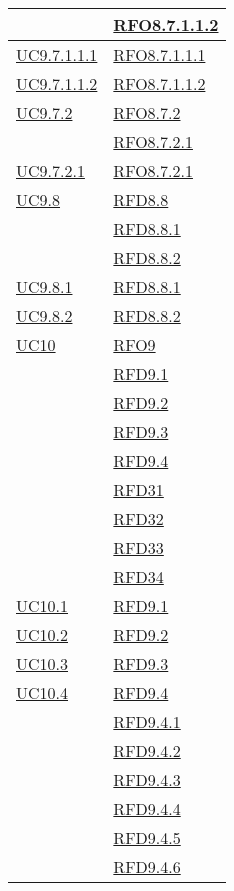 \begin{longtable}{|>{\centering}m{5cm}|m{5cm}<{\centering}|}
& \hyperlink{RFO8.7.1.1.2}{RFO8.7.1.1.2}\\ \hline
\hyperref[UC9.7.1.1.1]{UC9.7.1.1.1} & \hyperlink{RFO8.7.1.1.1}{RFO8.7.1.1.1}\\ \hline
\hyperref[UC9.7.1.1.2]{UC9.7.1.1.2} & \hyperlink{RFO8.7.1.1.2}{RFO8.7.1.1.2}\\ \hline
\hyperref[UC9.7.2]{UC9.7.2} & \hyperlink{RFO8.7.2}{RFO8.7.2}\\
& \hyperlink{RFO8.7.2.1}{RFO8.7.2.1}\\ \hline
\hyperref[UC9.7.2.1]{UC9.7.2.1} & \hyperlink{RFO8.7.2.1}{RFO8.7.2.1}\\ \hline
\hyperref[UC9.8]{UC9.8} & \hyperlink{RFD8.8}{RFD8.8}\\
& \hyperlink{RFD8.8.1}{RFD8.8.1}\\
& \hyperlink{RFD8.8.2}{RFD8.8.2}\\ \hline
\hyperref[UC9.8.1]{UC9.8.1} & \hyperlink{RFD8.8.1}{RFD8.8.1}\\ \hline
\hyperref[UC9.8.2]{UC9.8.2} & \hyperlink{RFD8.8.2}{RFD8.8.2}\\ \hline
\hyperref[UC10]{UC10} & \hyperlink{RFO9}{RFO9}\\
& \hyperlink{RFD9.1}{RFD9.1}\\
& \hyperlink{RFD9.2}{RFD9.2}\\
& \hyperlink{RFD9.3}{RFD9.3}\\
& \hyperlink{RFD9.4}{RFD9.4}\\
& \hyperlink{RFD31}{RFD31}\\
& \hyperlink{RFD32}{RFD32}\\
& \hyperlink{RFD33}{RFD33}\\
& \hyperlink{RFD34}{RFD34}\\ \hline
\hyperref[UC10.1]{UC10.1} & \hyperlink{RFD9.1}{RFD9.1}\\ \hline
\hyperref[UC10.2]{UC10.2} & \hyperlink{RFD9.2}{RFD9.2}\\ \hline
\hyperref[UC10.3]{UC10.3} & \hyperlink{RFD9.3}{RFD9.3}\\ \hline
\hyperref[UC10.4]{UC10.4} & \hyperlink{RFD9.4}{RFD9.4}\\
& \hyperlink{RFD9.4.1}{RFD9.4.1}\\
& \hyperlink{RFD9.4.2}{RFD9.4.2}\\
& \hyperlink{RFD9.4.3}{RFD9.4.3}\\
& \hyperlink{RFD9.4.4}{RFD9.4.4}\\
& \hyperlink{RFD9.4.5}{RFD9.4.5}\\
& \hyperlink{RFD9.4.6}{RFD9.4.6}\\ \hline

\end{longtable}
